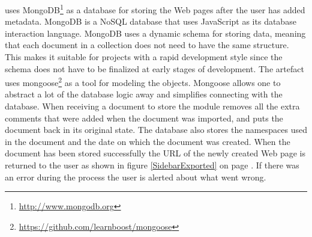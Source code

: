 \theartefact uses MongoDB\footnote{\url{http://www.mongodb.org}} as a database for storing the Web pages after the user has added metadata.
MongoDB is a NoSQL database that uses JavaScript as its database interaction language.
MongoDB uses a dynamic schema for storing data,
meaning that each document in a collection does not need to have the same structure.
This makes it suitable for projects with a rapid development style since the schema does not have to be
finalized at early stages of development.
The artefact uses mongoose\footnote{\url{https://github.com/learnboost/mongoose}} as a tool for modeling the objects.
Mongoose allows one to abstract a lot of the database logic away and simplifies connecting with the database.
When receiving a document to store the module removes all the extra comments that were added when the document was
imported, and puts the document back in its original state.
The database also stores the namespaces used in the document and the date on which the document was created.
When the document has been stored successfully the URL of the newly created Web page is returned to the user as shown in
figure \ref{SidebarExported} on page \pageref{SidebarExported}.
If there was an error during the process the user is alerted about what went wrong.
